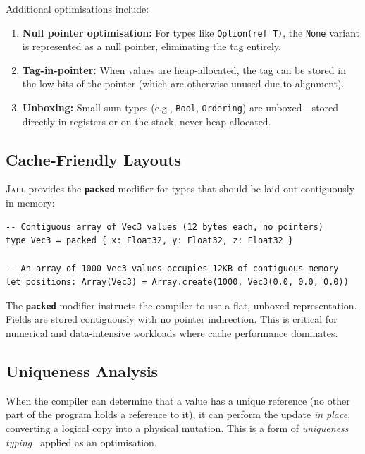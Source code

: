 \documentclass[11pt]{article}
\theoremstyle{definition}
\theoremstyle{remark}
\newcommand{\japl}{\textsc{Japl}}
\newcommand{\keyword}[1]{\texttt{\textbf{#1}}}
\begin{document}
Additional optimisations include:

\begin{enumerate}
  \item \textbf{Null pointer optimisation:} For types like
    \texttt{Option(ref T)}, the \texttt{None} variant is represented
    as a null pointer, eliminating the tag entirely.
  \item \textbf{Tag-in-pointer:} When values are heap-allocated, the
    tag can be stored in the low bits of the pointer (which are
    otherwise unused due to alignment).
  \item \textbf{Unboxing:} Small sum types (e.g., \texttt{Bool},
    \texttt{Ordering}) are unboxed---stored directly in registers or
    on the stack, never heap-allocated.
\end{enumerate}

\subsection{Cache-Friendly Layouts}
\label{sec:implementation:cache}

\japl{} provides the \keyword{packed} modifier for types that should
be laid out contiguously in memory:

\begin{lstlisting}[caption={Cache-friendly layout with \texttt{packed}.}]
-- Contiguous array of Vec3 values (12 bytes each, no pointers)
type Vec3 = packed { x: Float32, y: Float32, z: Float32 }

-- An array of 1000 Vec3 values occupies 12KB of contiguous memory
let positions: Array(Vec3) = Array.create(1000, Vec3(0.0, 0.0, 0.0))
\end{lstlisting}

The \keyword{packed} modifier instructs the compiler to use a flat,
unboxed representation.  Fields are stored contiguously with no
pointer indirection.  This is critical for numerical and
data-intensive workloads where cache performance dominates.

\subsection{Uniqueness Analysis}
\label{sec:implementation:uniqueness}

When the compiler can determine that a value has a unique reference
(no other part of the program holds a reference to it), it can perform
the update \emph{in place}, converting a logical copy into a physical
mutation.  This is a form of \emph{uniqueness typing}~\cite{barendsen1996uniqueness}
applied as an optimisation.
\end{document}

